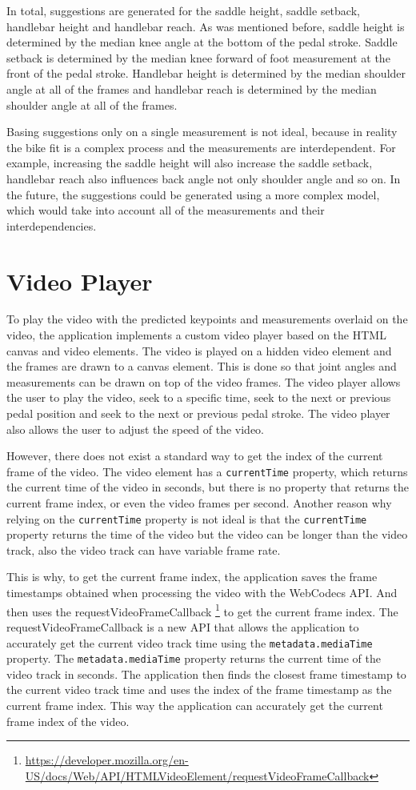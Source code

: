 In total, suggestions are generated for the saddle height, saddle setback, handlebar height and handlebar reach. As was mentioned before, saddle height is determined by the median knee angle at the bottom of the pedal stroke. Saddle setback is determined by the median knee forward of foot measurement at the front of the pedal stroke. Handlebar height is determined by the median shoulder angle at all of the frames and handlebar reach is determined by the median shoulder angle at all of the frames.

Basing suggestions only on a single measurement is not ideal, because in reality the bike fit is a complex process and the measurements are interdependent. For example, increasing the saddle height will also increase the saddle setback, handlebar reach also influences back angle not only shoulder angle and so on. In the future, the suggestions could be generated using a more complex model, which would take into account all of the measurements and their interdependencies.
\section{Video Player}
\label{video_player}
To play the video with the predicted keypoints and measurements overlaid on the video, the application implements a custom video player based on the HTML canvas and video elements. The video is played on a hidden video element and the frames are drawn to a canvas element. This is done so that joint angles and measurements can be drawn on top of the video frames. The video player allows the user to play the video, seek to a specific time, seek to the next or previous pedal position and seek to the next or previous pedal stroke. The video player also allows the user to adjust the speed of the video.

However, there does not exist a standard way to get the index of the current frame of the video. The video element has a \texttt{currentTime} property, which returns the current time of the video in seconds, but there is no property that returns the current frame index, or even the video frames per second. Another reason why relying on the \texttt{currentTime} property is not ideal is that the \texttt{currentTime} property returns the time of the video but the video can be longer than the video track, also the video track can have variable frame rate.

This is why, to get the current frame index, the application saves the frame timestamps obtained when processing the video with the WebCodecs API. And then uses the requestVideoFrameCallback \footnote{\url{https://developer.mozilla.org/en-US/docs/Web/API/HTMLVideoElement/requestVideoFrameCallback}} to get the current frame index. The requestVideoFrameCallback is a new API that allows the application to accurately get the current video track time using the \texttt{metadata.mediaTime} property. The \texttt{metadata.mediaTime} property returns the current time of the video track in seconds. The application then finds the closest frame timestamp to the current video track time and uses the index of the frame timestamp as the current frame index. This way the application can accurately get the current frame index of the video.




